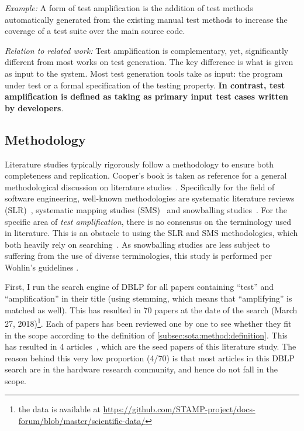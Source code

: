 \emph{Example:} 
A form of test amplification is the addition of test methods automatically generated from the existing manual test methods to increase the coverage of a test suite over the main source code.

\emph{Relation to related work:} 
Test amplification is complementary, yet, significantly different from most works on test generation.
The key difference is what is given as input to the system.
Most test generation tools take as input:
the program under test or a formal specification of the testing property.
\textbf{In contrast, test amplification is defined as taking as primary input test cases written by developers}. 


\subsection{Methodology}
\label{subsec:sota:method:methodology}

Literature studies typically rigorously follow a methodology to ensure both completeness and replication. 
Cooper's book is taken as reference for a general methodological discussion on literature studies~\cite{cooper1998synthesizing}. 
Specifically for the field of software engineering, well-known methodologies are systematic literature reviews (SLR)~\cite{kitchenham2004procedures}, systematic mapping studies (SMS)~\cite{petersen2008systematic} and snowballing studies~\cite{wohlin2014guidelines}.
For the specific area of \emph{test amplification}, there is no consensus on the terminology used in literature. 
This is an obstacle to using the SLR and SMS methodologies, which both heavily rely on searching~\cite{Brereton2007}. 
As snowballing studies are less subject to suffering from the use of diverse terminologies, this study is performed per Wohlin's guidelines \cite{wohlin2014guidelines,jalali2012systematic}.

First, I run the search engine of DBLP for all papers containing ``test'' and ``amplification'' in their title (using stemming, which means that ``amplifying'' is matched as well).
This has resulted in 70 papers at the date of the search (March 27, 2018)\footnote{the data is available at \url{https://github.com/STAMP-project/docs-forum/blob/master/scientific-data/}}.
Each of papers has been reviewed one by one to see whether they fit in the scope according to the definition of \autoref{subsec:sota:method:definition}. 
This has resulted in 4 articles~\cite{HamletV93,zhang2012,leung12,Joshi07}, which are the seed papers of this literature study. 
The reason behind this very low proportion (4/70) is that most articles in this DBLP search are in the hardware research community, and hence do not fall in the scope.

